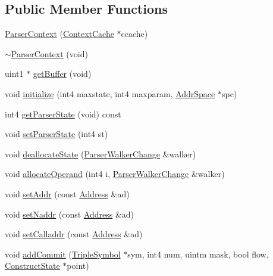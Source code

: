 \subsection*{Public Member Functions}
\begin{DoxyCompactItemize}
\item 
\mbox{\hyperlink{class_parser_context_a1f9d9209341ee399159bef431641eb08}{Parser\+Context}} (\mbox{\hyperlink{class_context_cache}{Context\+Cache}} $\ast$ccache)
\item 
\mbox{\hyperlink{class_parser_context_a8a561cf95869f260c22591de7035914e}{$\sim$\+Parser\+Context}} (void)
\item 
uint1 $\ast$ \mbox{\hyperlink{class_parser_context_a48bb82379ee3ff25a90e420a45506b20}{get\+Buffer}} (void)
\item 
void \mbox{\hyperlink{class_parser_context_ac8c76cf5ca381b1aedff9adb6334547c}{initialize}} (int4 maxstate, int4 maxparam, \mbox{\hyperlink{class_addr_space}{Addr\+Space}} $\ast$spc)
\item 
int4 \mbox{\hyperlink{class_parser_context_a092b001f0511b580e0fed894baf20036}{get\+Parser\+State}} (void) const
\item 
void \mbox{\hyperlink{class_parser_context_a49b8c4b331d6dad48a146c0675bf08c6}{set\+Parser\+State}} (int4 st)
\item 
void \mbox{\hyperlink{class_parser_context_aeadc3c9beab067825f0f0c0a25618f84}{deallocate\+State}} (\mbox{\hyperlink{class_parser_walker_change}{Parser\+Walker\+Change}} \&walker)
\item 
void \mbox{\hyperlink{class_parser_context_a93151174575222516e445bd6a06cb93c}{allocate\+Operand}} (int4 i, \mbox{\hyperlink{class_parser_walker_change}{Parser\+Walker\+Change}} \&walker)
\item 
void \mbox{\hyperlink{class_parser_context_a2806900c8b222d21f106031876b72e8e}{set\+Addr}} (const \mbox{\hyperlink{class_address}{Address}} \&ad)
\item 
void \mbox{\hyperlink{class_parser_context_ae9a4db4a509177c0797092372dfaabcb}{set\+Naddr}} (const \mbox{\hyperlink{class_address}{Address}} \&ad)
\item 
void \mbox{\hyperlink{class_parser_context_a804dc3663f33ae4a4ffb7278e7225546}{set\+Calladdr}} (const \mbox{\hyperlink{class_address}{Address}} \&ad)
\item 
void \mbox{\hyperlink{class_parser_context_a26c3fe0af432d556742152f7049dfcb9}{add\+Commit}} (\mbox{\hyperlink{class_triple_symbol}{Triple\+Symbol}} $\ast$sym, int4 num, uintm mask, bool flow, \mbox{\hyperlink{struct_construct_state}{Construct\+State}} $\ast$point)

\end{DoxyCompactItemize}

